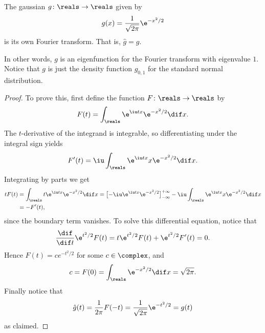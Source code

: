 \documentclass[article, a4paper, 11pt, oneside]{memoir}
\numberwithin{equation}{chapter}
\begin{document}
\begin{lemma}
    The gaussian $g \colon \reals \to \reals$ given by
    \begin{equation*}
        g(x) = \frac{1}{\sqrt{2\pi}} \e^{-x^2/2}
    \end{equation*}
    is its own Fourier transform. That is, $\hat{g} = g$.
\end{lemma}
%
In other words, $g$ is an eigenfunction for the Fourier transform with eigenvalue $1$. Notice that $g$ is just the density function $g_{0,1}$ for the standard normal distribution.

\begin{proof}
    To prove this, first define the function $F \colon \reals \to \reals$ by
    \begin{equation*}
        F(t)
            = \int_\reals \e^{\iu tx} \e^{-x^2/2} \dif x.
    \end{equation*}
    The $t$-derivative of the integrand is integrable, so differentiating under the integral sign yields
    \begin{equation*}
        F'(t)
            = \iu \int_\reals \e^{\iu tx} x \e^{-x^2/2} \dif x.
    \end{equation*}
    Integrating by parts we get
    \begin{align*}
        t F(t)
            &= \int_\reals t \e^{\iu tx} \e^{-x^2/2} \dif x
             = \bigl[ -\iu \e^{\iu tx} \e^{-x^2/2} \bigr]_{-\infty}^{+\infty} - \iu \int_\reals \e^{\iu tx} x \e^{-x^2/2} \dif x \\
            &= - F'(t),
    \end{align*}
    since the boundary term vanishes. To solve this differential equation, notice that
    \begin{equation*}
        \frac{\dif}{\dif t} \e^{t^2/2} F(t)
            = t \e^{t^2/2} F(t) + \e^{t^2/2} F'(t)
            = 0.
    \end{equation*}
    Hence $F(t) = c e^{-t^2/2}$ for some $c \in \complex$, and
    \begin{equation*}
        c
            = F(0)
            = \int_\reals \e^{-x^2/2} \dif x
            = \sqrt{2\pi}.
    \end{equation*}
    Finally notice that
    \begin{equation*}
        \hat{g}(t)
            = \frac{1}{2\pi} F(-t)
            = \frac{1}{\sqrt{2\pi}} \e^{-t^2/2}
            = g(t)
    \end{equation*}
    as claimed.
\end{proof}
\end{document}
